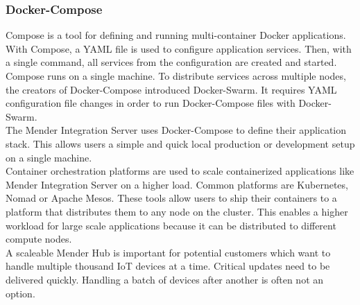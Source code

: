 \subsubsection{Docker-Compose} \label{docker-compose}
Compose is a tool for defining and running multi-container Docker applications. With Compose, a YAML file is used to configure application services. Then, with a single command, all services from the configuration are created and started.\cite{docker-compose}\\
Compose runs on a single machine. To distribute services across multiple nodes, the creators of Docker-Compose introduced Docker-Swarm. It requires YAML configuration file changes in order to run Docker-Compose files with Docker-Swarm.\\
The Mender Integration Server uses Docker-Compose to define their application stack. This allows users a simple and quick local production or development setup on a single machine.\\
Container orchestration platforms are used to scale containerized applications like Mender Integration Server on a higher load. Common platforms are Kubernetes, Nomad or Apache Mesos. These tools allow users to ship their containers to a platform that distributes them to any node on the cluster. This enables a higher workload for large scale applications because it can be distributed to different compute nodes.\\
A scaleable Mender Hub is important for potential customers which want to handle multiple thousand IoT devices at a time. Critical updates need to be delivered quickly. Handling a batch of devices after another is often not an option.
